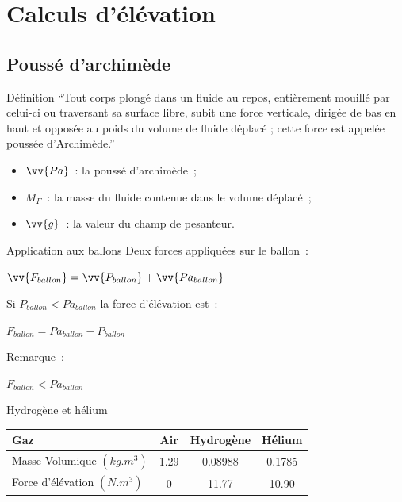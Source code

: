 

\section{Calculs d'élévation}

\subsection{Poussé d'archimède}

\begin{frame}{Définition}
  \enquote{Tout corps plongé dans un fluide au repos, entièrement mouillé par celui-ci ou traversant sa surface libre, subit une force verticale, dirigée de bas en haut et opposée au poids du volume de fluide déplacé ; cette force est appelée poussée d'Archimède.}
  \bigbreak
  \begin{center}
  \end{center}
  \begin{itemize}
    \item $\vv{Pa}$~: la poussé d'archimède~;
    \item $M_F$~: la masse du fluide contenue dans le volume déplacé~;
    \item $\vv{g}$~: la valeur du champ de pesanteur.
  \end{itemize}
\end{frame}

\begin{frame}{Application aux ballons}
  Deux forces appliquées sur le ballon~: \\
  \begin{center}
    $\displaystyle{\vv{F_{ballon}} = \vv{P_{ballon}} + \vv{Pa_{ballon}}}$ \\
  \end{center}
  Si $P_{ballon} < Pa_{ballon}$ la force d'élévation est~:
  \begin{center}
    $\displaystyle{F_{ballon} = Pa_{ballon} - P_{ballon}}$ \\
  \end{center}
  Remarque~:\\
  \begin{center}
    $F_{ballon} < Pa_{ballon}$
  \end{center}
\end{frame}

\begin{frame}{Hydrogène et hélium}
	\begin{center}
		\begin{tabular}{|l|c|c|c|}
			\hline
			Gaz & Air & Hydrogène & Hélium \\
			\hline
			Masse Volumique $(kg.m^3)$ & 1.29 & 0.08988 & 0.1785 \\
			\hline
			Force d'élévation $(N.m^3)$ & 0 & 11.77 & 10.90 \\
			\hline
		\end{tabular}
	\end{center}
\end{frame}



